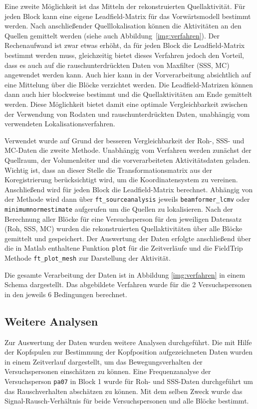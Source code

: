 \documentclass[doc,a4paper,12pt]{apa6}
\begin{document}
Eine zweite Möglichkeit ist das Mitteln der rekonstruierten Quellaktivität. Für jeden Block kann eine eigene Leadfield-Matrix für das Vorwärtsmodell bestimmt werden. Nach anschließender Quelllokalisation können die Aktivitäten an den Quellen gemittelt werden (siehe auch Abbildung~\ref{img:verfahren}). Der Rechenaufwand ist zwar etwas erhöht, da für jeden Block die Leadfield-Matrix bestimmt werden muss, gleichzeitig bietet dieses Verfahren jedoch den Vorteil, dass es auch auf die rauschunterdrückten Daten von Maxfilter (SSS, MC) angewendet werden kann. Auch hier kann in der Vorverarbeitung absichtlich auf eine Mittelung über die Blöcke verzichtet werden. Die Leadfield-Matrizen können dann auch hier blockweise bestimmt und die Quellaktivitäten am Ende gemittelt werden. Diese Möglichkeit bietet damit eine optimale Vergleichbarkeit zwischen der Verwendung von Rodaten und rauschunterdrückten Daten, unabhängig vom verwendeten Lokalisationsverfahren.

Verwendet wurde auf Grund der besseren Vergleichbarkeit der Roh-, SSS- und MC-Daten die zweite Methode. Unabhängig vom Verfahren werden zunächst der Quellraum, der Volumenleiter und die vorverarbeiteten Aktivitätsdaten geladen. Wichtig ist, dass an dieser Stelle die Transformationsmatrix aus der Koregistrierung berücksichtigt wird, um die Koordinatensystem zu vereinen. Anschließend wird für jeden Block die Leadfield-Matrix berechnet. Abhängig von der Methode wird dann über \texttt{ft\_sourceanalysis} jeweils \texttt{beamformer\_lcmv} oder \texttt{minimumnormestimate} aufgerufen um die Quellen zu lokalisieren. Nach der Berechnung aller Blöcke für eine Versuchsperson für den jeweiligen Datensatz (Roh, SSS, MC) wurden die rekonstruierten Quellaktivitäten über alle Blöcke gemittelt und gespeichert. Der Auswertung der Daten erfolgte anschließend über die in Matlab enthaltene Funktion \texttt{plot} für die Zeitverläufe und die FieldTrip Methode \texttt{ft\_plot\_mesh} zur Darstellung der Aktivität.

Die gesamte Verarbeitung der Daten ist in Abbildung \ref{img:verfahren} in einem Schema dargestellt. Das abgebildete Verfahren wurde für die 2 Versuchspersonen in den jeweils 6 Bedingungen berechnet.

\subsection{Weitere Analysen}

Zur Auswertung der Daten wurden weitere Analysen durchgeführt. Die mit Hilfe der Kopfspulen zur Bestimmung der Kopfposition aufgezeichneten Daten wurden in einem Zeitverlauf dargestellt, um das Bewegungsverhalten der Versuchspersonen einschätzen zu können. Eine Frequenzanalyse der Versuchsperson \texttt{pa07} in Block 1 wurde für Roh- und SSS-Daten durchgeführt um das Rauschverhalten abschätzen zu können. Mit dem selben Zweck wurde das Signal-Rausch-Verhältnis für beide Versuchspersonen und alle Blöcke bestimmt.
\end{document}

